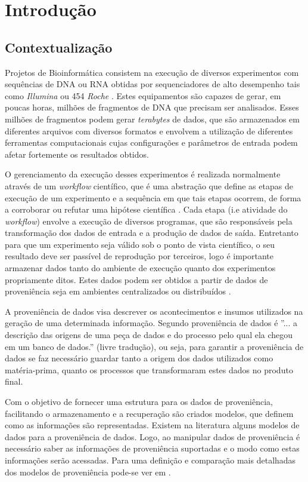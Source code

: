 \chapter{Introdução}
\section{Contextualização} 

Projetos de Bioinformática consistem na execução de diversos experimentos com sequências de DNA ou RNA obtidas por sequenciadores de alto desempenho tais como \textit{Illumina} \cite{bentley} ou 454 \textit{Roche} \cite{rothberg}. Estes equipamentos são capazes de gerar, em poucas horas, milhões de fragmentos de DNA \cite{schuster} que precisam ser analisados. Esses milhões de fragmentos podem gerar \textit{terabytes} de dados, que são armazenados em diferentes arquivos com diversos formatos e envolvem a utilização de diferentes ferramentas computacionais cujas configurações e parâmetros de entrada podem afetar fortemente os resultados obtidos.

O gerenciamento da execução desses experimentos é realizada normalmente através de um \textit{workflow} científico, que é uma abstração que define as etapas de execução de um experimento e a sequência em que tais etapas ocorrem, de forma a corroborar ou refutar uma hipótese científica \cite{jarrad}. Cada etapa (i.e atividade do \textit{workflow}) envolve a execução de diversos programas, que são responsáveis pela transformação dos dados de entrada e a produção de dados de saída. Entretanto para que um experimento seja válido sob o ponto de vista científico, o seu resultado deve ser passível de reprodução por terceiros, logo é importante armazenar dados tanto do ambiente de execução quanto dos experimentos propriamente ditos. Estes dados podem ser obtidos a partir de dados de proveniência seja em ambientes centralizados ou distribuídos \cite{altintas}. 

A proveniência de dados visa descrever os acontecimentos e insumos utilizados na geração de uma determinada informação. Segundo \cite{buneman} proveniência de dados é ''... a descrição das origens de uma peça de dados e do processo pelo qual ela chegou em um banco de dados.'' (livre tradução), ou seja, para garantir a proveniência de dados se faz necessário guardar tanto a origem dos dados utilizados como matéria-prima, quanto os processos que transformaram estes dados no produto final.

Com o objetivo de fornecer uma estrutura para os dados de proveniência, facilitando o armazenamento e a recuperação são criados modelos, que definem como as informações são representadas. Existem na literatura alguns modelos de dados para a proveniência de dados. Logo, ao manipular dados de proveniência é necessário saber as informações de proveniência suportadas e o modo como estas informações serão acessadas. Para uma definição e comparação mais detalhadas dos modelos de proveniência pode-se ver em \cite{renato}.  

